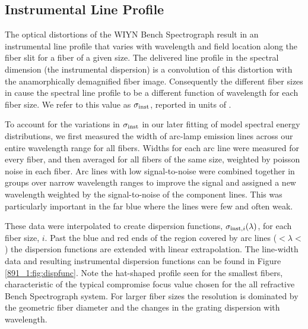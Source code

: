 \subsection{Instrumental Line Profile}
\label{891_1:sec:GPak_dispersion}

The optical distortions of the WIYN Bench Spectrograph result in an
instrumental line profile that varies with wavelength and field
location along the fiber slit for a fiber of a given size. The
delivered line profile in the spectral dimension (the instrumental
dispersion) is a convolution of this distortion with the
anamorphically demagnified fiber image. Consequently the different
fiber sizes in \GP cause the spectral line profile to be a different
function of wavelength for each fiber size. We refer to this value as
$\sigma_{\rm inst}$, reported in units of \kms.

To account for the variations in $\sigma_{\rm inst}$ in our later
fitting of model spectral energy distributions, we first measured the
width of arc-lamp emission lines across our entire wavelength range
for all fibers. Widths for each arc line were measured for every
fiber, and then averaged for all fibers of the same size, weighted by
poisson noise in each fiber. Arc lines with low signal-to-noise were
combined together in groups over narrow wavelength ranges to improve
the signal and assigned a new wavelength weighted by the
signal-to-noise of the component lines. This was particularly
important in the far blue where the lines were few and often
weak.

These data were interpolated to create dispersion functions,
$\sigma_{{\rm inst},i}(\lambda)$, for each fiber size, $i$. Past the
blue and red ends of the region covered by arc lines
($<\lambda <$ ) the dispersion functions
are extended with linear extrapolation. The line-width data and
resulting instrumental dispersion functions can be found in Figure
\ref{891_1:fig:dispfunc}. Note the hat-shaped profile seen for the smallest
fibers, characteristic of the typical compromise focus value chosen
for the all refractive Bench Spectrograph system. For larger fiber
sizes the resolution is dominated by the geometric fiber diameter and
the changes in the grating dispersion with wavelength.


